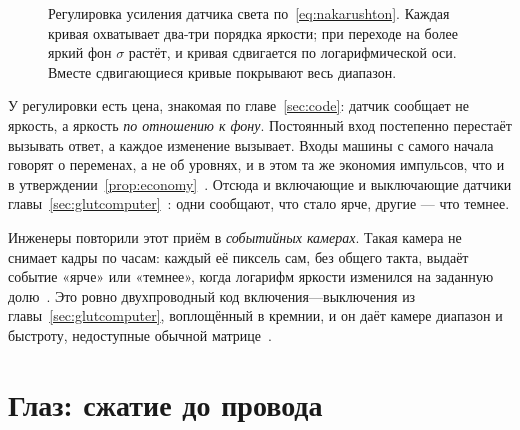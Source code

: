 \begin{figure}[t]
\centering
{}
\caption{Регулировка усиления датчика света по~\eqref{eq:nakarushton}. Каждая кривая охватывает два-три порядка яркости; при переходе на более яркий фон $\sigma$ растёт, и кривая сдвигается по логарифмической оси. Вместе сдвигающиеся кривые покрывают весь диапазон.}
\label{fig:adaptation}
\end{figure}

У регулировки есть цена, знакомая по главе~\ref{sec:code}: датчик сообщает не яркость, а яркость \emph{по отношению к фону}. Постоянный вход постепенно перестаёт вызывать ответ, а каждое изменение вызывает. Входы машины с самого начала говорят о переменах, а не об уровнях, и в этом та же экономия импульсов, что и в утверждении~\ref{prop:economy}~\cite{Barlow1961}. Отсюда и включающие и выключающие датчики главы~\ref{sec:glutcomputer}~\cite{Schiller1992}: одни сообщают, что стало ярче, другие --- что темнее.

Инженеры повторили этот приём в \emph{событийных камерах}. Такая камера не снимает кадры по часам: каждый её пиксель сам, без общего такта, выдаёт событие «ярче» или «темнее», когда логарифм яркости изменился на заданную долю~\cite{Lichtsteiner2008}. Это ровно двухпроводный код включения---выключения из главы~\ref{sec:glutcomputer}, воплощённый в кремнии, и он даёт камере диапазон и быстроту, недоступные обычной матрице~\cite{Gallego2022}.

\section{Глаз: сжатие до провода}

